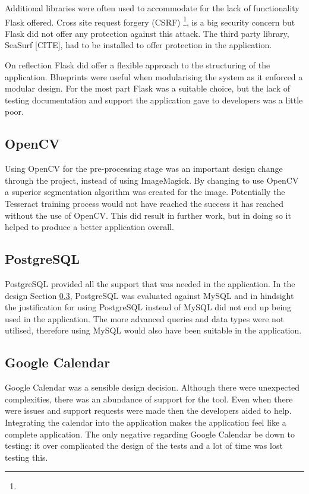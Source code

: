 Additional libraries were often used to accommodate for the lack of functionality Flask offered. Cross site request forgery (CSRF) \footnote{}, is a big security concern but Flask did not offer any protection against this attack. The third party library, SeaSurf [CITE], had to be installed to offer protection in the application.

On reflection Flask did offer a flexible approach to the structuring of the application. Blueprints were useful when modularising the system as it enforced a modular design. For the most part Flask was a suitable choice, but the lack of testing documentation and support the application gave to developers was a little poor.

\subsection{OpenCV}
Using OpenCV for the pre-processing stage was an important design change through the project, instead of using ImageMagick. By changing to use OpenCV a superior segmentation algorithm was created for the image. Potentially the Tesseract training process would not have reached the success it has reached without the use of OpenCV. This did result in further work,  but in doing so it helped to produce a better application overall.

\subsection{PostgreSQL}
PostgreSQL provided all the support that was needed in the application. In the design Section \ref{}, PostgreSQL was evaluated against MySQL and in hindsight the justification for using PostgreSQL instead of MySQL did not end up being used in the application. The more advanced queries and data types were not utilised, therefore using MySQL would also have been suitable in the application.

\subsection{Google Calendar}
Google Calendar was a sensible design decision. Although there were unexpected complexities, there was an abundance of support for the tool. Even when there were issues and support requests were made then the developers aided to help. Integrating the calendar into the application makes the application feel like a complete application. The only negative regarding Google Calendar be down to testing: it over complicated the design of the tests and a lot of time was lost testing this.

